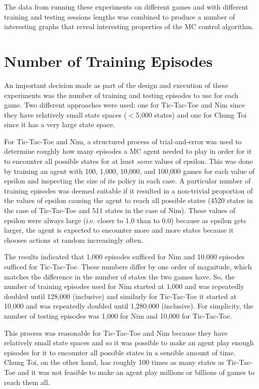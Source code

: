 \documentclass[11pt,a4paper,twoside,openright]{report}
\begin{document}
The data from running these experiments on different games and with different training and testing sessions lengths was combined to produce a number of interesting graphs that reveal interesting properties of the MC control algorithm.


\section{Number of Training Episodes}

An important decision made as part of the design and execution of these experiments was the number of training and testing episodes to use for each game. Two different approaches were used: one for Tic-Tac-Toe and Nim since they have relatively small state spaces ($<$5,000 states) and one for Chung Toi since it has a very large state space.

For Tic-Tac-Toe and Nim, a structured process of trial-and-error was used to determine roughly how many episodes a MC agent needed to play in order for it to encounter all possible states for at least \emph{some} values of epsilon. This was done by training an agent with 100, 1,000, 10,000, and 100,000 games for each value of epsilon and inspecting the size of its policy in each case. A particular number of training episodes was deemed suitable if it resulted in a non-trivial proportion of the values of epsilon causing the agent to reach all possible states (4520 states in the case of Tic-Tac-Toe and 511 states in the case of Nim). These values of epsilon were always large (i.e. closer to 1.0 than to 0.0) because as epsilon gets larger, the agent is expected to encounter more and more states because it chooses actions at random increasingly often.

The results indicated that 1,000 episodes sufficed for Nim and 10,000 episodes sufficed for Tic-Tac-Toe. These numbers differ by one order of magnitude, which matches the difference in the number of states the two games have. So, the number of training episodes used for Nim started at 1,000 and was repeatedly doubled until 128,000 (inclusive) and similarly for Tic-Tac-Toe it started at 10,000 and was repeatedly doubled until 1,280,000 (inclusive). For simplicity, the number of testing episodes was 1,000 for Nim and 10,000 for Tic-Tac-Toe.

This process was reasonable for Tic-Tac-Toe and Nim because they have relatively small state spaces and so it was possible to make an agent play enough episodes for it to encounter all possible states in a sensible amount of time. Chung Toi, on the other hand, has roughly 100 times as many states as Tic-Tac-Toe and it was not feasible to make an agent play millions or billions of games to reach them all.
\end{document}
